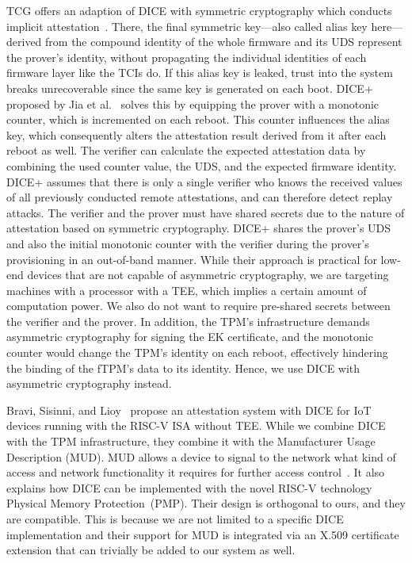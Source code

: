 \ac{TCG} offers an adaption of \ac{DICE} with symmetric cryptography which conducts implicit attestation~\cite{dice-symmetric-arch}.
There, the final symmetric key---also called alias key here---derived from the compound identity of the whole firmware and its UDS represent the prover's identity, without propagating the individual identities of each firmware layer like the \acp{TCI} do.
If this alias key is leaked, trust into the system breaks unrecoverable since the same key is generated on each boot.
DICE+ proposed by Jia et al.~\cite{Jia2020} solves this by equipping the prover with a monotonic counter, which is incremented on each reboot.
This counter influences the alias key, which consequently alters the attestation result derived from it after each reboot as well.
The verifier can calculate the expected attestation data by combining the used counter value, the UDS, and the expected firmware identity.
DICE+ assumes that there is only a single verifier who knows the received values of all previously conducted remote attestations, and can therefore detect replay attacks.
The verifier and the prover must have shared secrets due to the nature of attestation based on symmetric cryptography.
DICE+ shares the prover's UDS and also the initial monotonic counter with the verifier during the prover's provisioning in an out-of-band manner.
While their approach is practical for low-end devices that are not capable of asymmetric cryptography, we are targeting machines with a processor with a \ac{TEE}, which implies a certain amount of computation power.
We also do not want to require pre-shared secrets between the verifier and the prover.
In addition, the TPM's infrastructure demands asymmetric cryptography for signing the EK certificate, and the monotonic counter would change the TPM's identity on each reboot, effectively hindering the binding of the fTPM's data to its identity.
Hence, we use DICE with asymmetric cryptography instead.

Bravi, Sisinni, and Lioy~\cite{Bravi2023} propose an attestation system with DICE for IoT devices running with the RISC-V ISA without TEE\@.
While we combine DICE with the TPM infrastructure, they combine it with the Manufacturer Usage Description (MUD).
MUD allows a device to signal to the network what kind of access and network functionality it requires for further access control~\cite{Lear2019}.
It also explains how DICE can be implemented with the novel RISC-V technology Physical Memory Protection~(PMP).
Their design is orthogonal to ours, and they are compatible.
This is because we are not limited to a specific DICE implementation and their support for MUD is integrated via an X.509 certificate extension that can trivially be added to our system as well.

